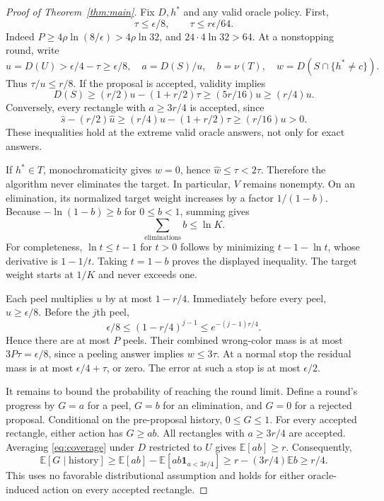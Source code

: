 \documentclass[11pt]{article}
\newcommand{\E}{\mathbb E}
\newcommand{\1}{\mathbf 1}
\begin{document}
\begin{proof}[Proof of Theorem~\ref{thm:main}]
Fix $D,h^*$ and any valid oracle policy. First,
\begin{equation}\label{eq:tau-small}
 \tau\le\epsilon/8,\qquad \tau\le r\epsilon/64.
\end{equation}
Indeed $P\ge4\rho\ln(8/\epsilon)>4\rho\ln32$, and $24\cdot4\ln32>64$. At a nonstopping round, write
\[
 u=D(U)>\epsilon/4-\tau\ge\epsilon/8,
 \quad a=D(S)/u,\quad b=\nu(T),\quad w=D(S\cap\{h^*\ne c\}).
\]
Thus $\tau/u\le r/8$. If the proposal is accepted, validity implies
\[
 D(S)\ge(r/2)u-(1+r/2)\tau\ge(5r/16)u\ge(r/4)u.
\]
Conversely, every rectangle with $a\ge3r/4$ is accepted, since
\[
 \widehat s-(r/2)\widehat u
 \ge(r/4)u-(1+r/2)\tau\ge(r/16)u>0.
\]
These inequalities hold at the extreme valid oracle answers, not only for exact answers.

If $h^*\in T$, monochromaticity gives $w=0$, hence $\widehat w\le\tau<2\tau$. Therefore the algorithm never eliminates the target. In particular, $V$ remains nonempty. On an elimination, its normalized target weight increases by a factor $1/(1-b)$. Because $-\ln(1-b)\ge b$ for $0\le b<1$, summing gives
\begin{equation}\label{eq:elim-budget}
 \sum_{\text{eliminations}} b\le\ln K.
\end{equation}
For completeness, $\ln t\le t-1$ for $t>0$ follows by minimizing $t-1-\ln t$, whose derivative is $1-1/t$. Taking $t=1-b$ proves the displayed inequality. The target weight starts at $1/K$ and never exceeds one.

Each peel multiplies $u$ by at most $1-r/4$. Immediately before every peel, $u\ge\epsilon/8$. Before the $j$th peel,
\[
 \epsilon/8\le(1-r/4)^{j-1}\le e^{-(j-1)r/4}.
\]
Hence there are at most $P$ peels. Their combined wrong-color mass is at most $3P\tau=\epsilon/8$, since a peeling answer implies $w\le3\tau$. At a normal stop the residual mass is at most $\epsilon/4+\tau$, or zero. The error at such a stop is at most $\epsilon/2$.

It remains to bound the probability of reaching the round limit. Define a round's progress by $G=a$ for a peel, $G=b$ for an elimination, and $G=0$ for a rejected proposal. Conditional on the pre-proposal history, $0\le G\le1$. For every accepted rectangle, either action has $G\ge ab$. All rectangles with $a\ge3r/4$ are accepted. Averaging \eqref{eq:coverage} under $D$ restricted to $U$ gives $\E[ab]\ge r$. Consequently,
\begin{equation}\label{eq:drift}
 \E[G\mid\text{history}]
 \ge \E[ab]-\E[ab\1_{a<3r/4}]
 \ge r-(3r/4)\E b\ge r/4.
\end{equation}
This uses no favorable distributional assumption and holds for either oracle-induced action on every accepted rectangle.


\end{proof}
\end{document}

